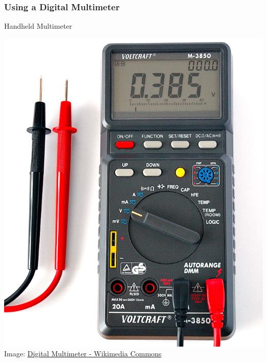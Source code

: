 \documentclass[fleqn]{beamer} %
\newcommand{\sectionIsubsectionIItitle}{Using a Digital Multimeter}
\begin{document}
			\begin{frame}
				\frametitle{\sectionIsubsectionIItitle}
				Handheld Multimeter

				\begin{multicols}{3}
					 
					\includegraphics[scale=.15]{images/Digital_Multimeter_Aka.jpg}
					\tiny{Image: \href{https://commons.wikimedia.org/wiki/File:Digital_Multimeter_Aka.jpg}{Digital Multimeter - Wikimedia Commons}}


\end{multicols}
\end{frame}
\end{document}
